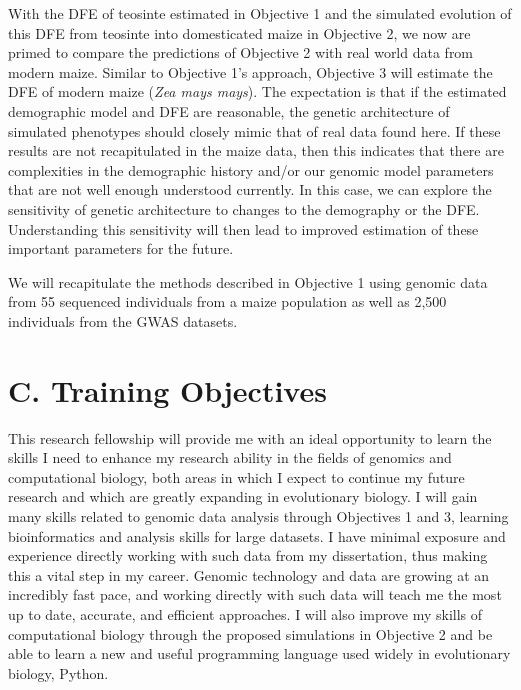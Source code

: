 With the DFE of teosinte estimated in Objective 1 and the simulated evolution of this DFE from teosinte into domesticated maize in Objective 2, we now are primed to compare the predictions of Objective 2 with real world data from modern maize. Similar to Objective 1's approach, Objective 3 will estimate the DFE of modern maize (\emph{Zea mays mays}). The expectation is that if the estimated demographic model and DFE are reasonable, the genetic architecture of simulated phenotypes should closely mimic that of real data found here. If these results are not recapitulated in the maize data, then this indicates that there are complexities in the demographic history and\//or our genomic model parameters that are not well enough understood currently. In this case, we can explore the sensitivity of genetic architecture to changes to the demography or the DFE. Understanding this sensitivity will then lead to improved estimation of these important parameters for the future.

We will recapitulate the methods described in Objective 1 using genomic data from 55 sequenced individuals from a maize population as well as 2,500 individuals from the GWAS datasets.

	
	
	
	
	
	
	
	
\section*{C. Training Objectives}

This research fellowship will provide me with an ideal opportunity to learn the skills I need to enhance my research ability in the fields of genomics and computational biology, both areas in which I expect to continue my future research and which are greatly expanding in evolutionary biology. I will gain many skills related to genomic data analysis through Objectives 1 and 3, learning bioinformatics and analysis skills for large datasets. I have minimal exposure and experience directly working with such data from my dissertation, thus making this a vital step in my career. Genomic technology and data are growing at an incredibly fast pace, and working directly with such data will teach me the most up to date, accurate, and efficient approaches. I will also improve my skills of computational biology through the proposed simulations in Objective 2 and be able to learn a new and useful programming language used widely in evolutionary biology, Python. 


